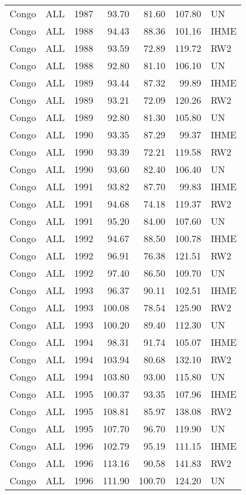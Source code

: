 \begin{longtable}{lllrrrl}
  Congo & ALL & 1987 & 93.70 & 81.60 & 107.80 & UN \\ 
  Congo & ALL & 1988 & 94.43 & 88.36 & 101.16 & IHME \\ 
  Congo & ALL & 1988 & 93.59 & 72.89 & 119.72 & RW2 \\ 
  Congo & ALL & 1988 & 92.80 & 81.10 & 106.10 & UN \\ 
  Congo & ALL & 1989 & 93.44 & 87.32 & 99.89 & IHME \\ 
  Congo & ALL & 1989 & 93.21 & 72.09 & 120.26 & RW2 \\ 
  Congo & ALL & 1989 & 92.80 & 81.30 & 105.80 & UN \\ 
  Congo & ALL & 1990 & 93.35 & 87.29 & 99.37 & IHME \\ 
  Congo & ALL & 1990 & 93.39 & 72.21 & 119.58 & RW2 \\ 
  Congo & ALL & 1990 & 93.60 & 82.40 & 106.40 & UN \\ 
  Congo & ALL & 1991 & 93.82 & 87.70 & 99.83 & IHME \\ 
  Congo & ALL & 1991 & 94.68 & 74.18 & 119.37 & RW2 \\ 
  Congo & ALL & 1991 & 95.20 & 84.00 & 107.60 & UN \\ 
  Congo & ALL & 1992 & 94.67 & 88.50 & 100.78 & IHME \\ 
  Congo & ALL & 1992 & 96.91 & 76.38 & 121.51 & RW2 \\ 
  Congo & ALL & 1992 & 97.40 & 86.50 & 109.70 & UN \\ 
  Congo & ALL & 1993 & 96.37 & 90.11 & 102.51 & IHME \\ 
  Congo & ALL & 1993 & 100.08 & 78.54 & 125.90 & RW2 \\ 
  Congo & ALL & 1993 & 100.20 & 89.40 & 112.30 & UN \\ 
  Congo & ALL & 1994 & 98.31 & 91.74 & 105.07 & IHME \\ 
  Congo & ALL & 1994 & 103.94 & 80.68 & 132.10 & RW2 \\ 
  Congo & ALL & 1994 & 103.80 & 93.00 & 115.80 & UN \\ 
  Congo & ALL & 1995 & 100.37 & 93.35 & 107.96 & IHME \\ 
  Congo & ALL & 1995 & 108.81 & 85.97 & 138.08 & RW2 \\ 
  Congo & ALL & 1995 & 107.70 & 96.70 & 119.90 & UN \\ 
  Congo & ALL & 1996 & 102.79 & 95.19 & 111.15 & IHME \\ 
  Congo & ALL & 1996 & 113.16 & 90.58 & 141.83 & RW2 \\ 
  Congo & ALL & 1996 & 111.90 & 100.70 & 124.20 & UN \\ 

\end{longtable}
